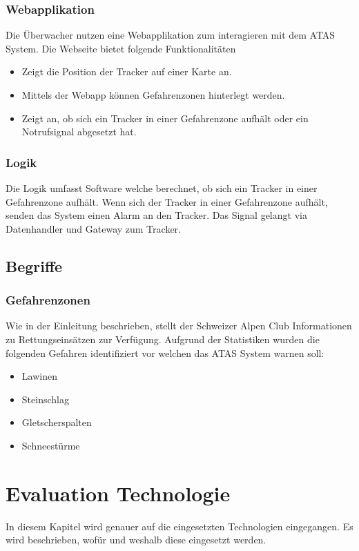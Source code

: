 \documentclass[11pt,english,german]{report}
\theoremstyle{definition}
\begin{document}
\subsection{Webapplikation}
Die Überwacher nutzen eine Webapplikation zum interagieren mit dem ATAS System. Die Webseite bietet folgende Funktionalitäten
\begin{itemize}
	\item
		Zeigt die Position der Tracker auf einer Karte an. 
	\item
		Mittels der Webapp können Gefahrenzonen hinterlegt werden.
	\item 
		Zeigt an, ob sich ein Tracker in einer Gefahrenzone aufhält oder ein Notrufsignal abgesetzt hat.	
\end{itemize}

\subsection{Logik}
Die Logik umfasst Software welche berechnet, ob sich ein Tracker in einer Gefahrenzone aufhält. Wenn sich der Tracker in einer Gefahrenzone aufhält, senden das System einen Alarm an den Tracker. Das Signal gelangt via Datenhandler und Gateway zum Tracker.

\section{Begriffe}
\subsection{Gefahrenzonen}
Wie in der Einleitung beschrieben, stellt der Schweizer Alpen Club Informationen zu Rettungseinsätzen zur Verfügung. Aufgrund der Statistiken wurden die folgenden Gefahren identifiziert vor welchen das ATAS System warnen soll:
\begin{itemize}
	\item Lawinen
	\item Steinschlag
	\item Gletscherspalten
	\item Schneestürme
\end{itemize}

\chapter{Evaluation Technologie}
In diesem Kapitel wird genauer auf die eingesetzten Technologien eingegangen. Es wird beschrieben, wofür und weshalb diese eingesetzt werden. 
\end{document}
